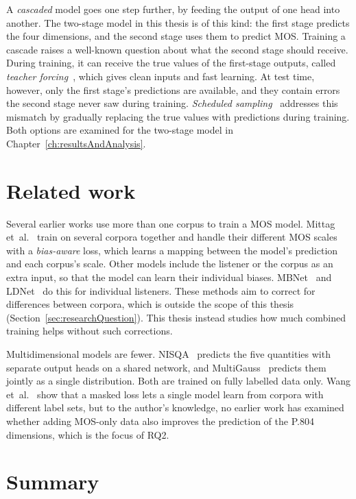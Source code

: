 \documentclass[
english,                 %
bibtex,                  %
includeExtraAbstracts, %
]{kththesis}
\numberwithin{listing}{chapter}
\begin{document}
A \emph{cascaded} model goes one step further, by feeding the output of one head into another. The two-stage model in this thesis is of this kind: the first stage predicts the four dimensions, and the second stage uses them to predict MOS. Training a cascade raises a well-known question about what the second stage should receive. During training, it can receive the true values of the first-stage outputs, called \emph{teacher forcing}~\cite{williams_zipser_1989}, which gives clean inputs and fast learning. At test time, however, only the first stage's predictions are available, and they contain errors the second stage never saw during training. \emph{Scheduled sampling}~\cite{bengio_scheduled_2015} addresses this mismatch by gradually replacing the true values with predictions during training. Both options are examined for the two-stage model in Chapter~\ref{ch:resultsAndAnalysis}.

\section{Related work}
\label{sec:relatedWork}

Several earlier works use more than one corpus to train a MOS model. Mittag et~al.~\cite{mittag_biasaware_2021} train on several corpora together and handle their different MOS scales with a \emph{bias-aware} loss, which learns a mapping between the model's prediction and each corpus's scale. Other models include the listener or the corpus as an extra input, so that the model can learn their individual biases. MBNet~\cite{leng_mbnet_2021} and LDNet~\cite{huang_ldnet_2022} do this for individual listeners. These methods aim to correct for differences between corpora, which is outside the scope of this thesis (Section~\ref{sec:researchQuestion}). This thesis instead studies how much combined training helps without such corrections.

Multidimensional models are fewer. NISQA~\cite{mittag_nisqa_2021} predicts the five quantities with separate output heads on a shared network, and MultiGauss~\cite{cumlin_multigauss_2025} predicts them jointly as a single distribution. Both are trained on fully labelled data only. Wang et~al.~\cite{wang_urgentmos_2026} show that a masked loss lets a single model learn from corpora with different label sets, but to the author's knowledge, no earlier work has examined whether adding MOS-only data also improves the prediction of the P.804 dimensions, which is the focus of RQ2.

\section{Summary}
\label{sec:backgroundSummary}
\end{document}
